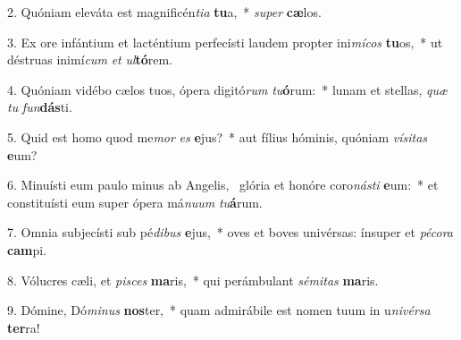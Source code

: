 2. Quóniam eleváta est magnificén\textit{ti}\textit{a} \textbf{tu}a,~*  \textit{su}\textit{per} \textbf{cæ}los.\

3. Ex ore infántium et lacténtium perfecísti laudem propter ini\textit{mí}\textit{cos} \textbf{tu}os,~*  ut déstruas inimí\textit{cum} \textit{et} \textit{ul}\textbf{tó}rem.\

4. Quóniam vidébo cælos tuos, ópera digitó\textit{rum} \textit{tu}\textbf{ó}rum:~*  lunam et stellas, \textit{quæ} \textit{tu} \textit{fun}\textbf{dás}ti.\

5. Quid est homo quod me\textit{mor} \textit{es} \textbf{e}jus?~*  aut fílius hóminis, quóniam \textit{ví}\textit{si}\textit{tas} \textbf{e}um?\

6. Minuísti eum paulo minus ab Angelis, \dag\  glória et honóre coro\textit{nás}\textit{ti} \textbf{e}um:~*  et constituísti eum super ópera má\textit{nu}\textit{um} \textit{tu}\textbf{á}rum.\

7. Omnia subjecísti sub pé\textit{di}\textit{bus} \textbf{e}jus,~*  oves et boves univérsas: ínsuper et \textit{pé}\textit{co}\textit{ra} \textbf{cam}pi.\

8. Vólucres cæli, et \textit{pi}\textit{sces} \textbf{ma}ris,~*  qui perámbulant \textit{sé}\textit{mi}\textit{tas} \textbf{ma}ris.\

9. Dómine, Dó\textit{mi}\textit{nus} \textbf{nos}ter,~*  quam admirábile est nomen tuum in u\textit{ni}\textit{vér}\textit{sa} \textbf{ter}ra!\

